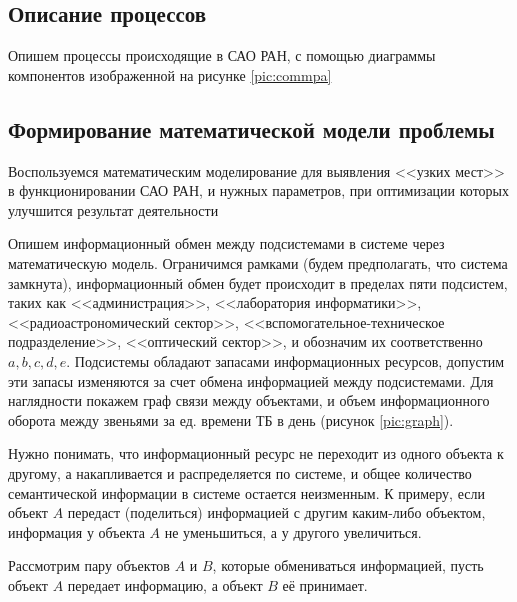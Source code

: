    
\subsection{Описание процессов}
Опишем процессы происходящие в САО РАН, с помощью диаграммы компонентов изображенной на рисунке \ref{pic:commpa} 


\subsection{Формирование математической модели проблемы}
Воспользуемся математическим моделирование для выявления <<узких мест>> в функционировании САО РАН, и нужных параметров, при оптимизации которых улучшится результат деятельности

Опишем информационный обмен между подсистемами в системе через математическую модель. Ограничимся рамками (будем предполагать, что система замкнута), информационный обмен будет  происходит в пределах пяти подсистем, таких как <<администрация>>, <<лаборатория информатики>>, <<радиоастрономический сектор>>, <<вспомогательное-техническое подразделение>>, <<оптический сектор>>, и обозначим их соответственно $a, b, c, d, e$. Подсистемы обладают запасами информационных ресурсов, допустим эти запасы изменяются за счет обмена информацией между подсистемами. Для наглядности покажем граф связи между объектами, и объем информационного оборота между звеньями за ед. времени ТБ в день (рисунок \ref{pic:graph}).




Нужно понимать, что информационный ресурс не переходит из одного объекта к другому, а накапливается и распределяется по системе, и общее количество семантической информации в системе остается неизменным. К примеру, если объект $A$ передаст (поделиться) информацией с другим каким-либо объектом, информация у объекта $A$ не уменьшиться, а у другого увеличиться.

Рассмотрим пару объектов $A$ и $B$, которые обмениваться информацией, пусть объект $A$ передает информацию, а объект $B$ её принимает.

